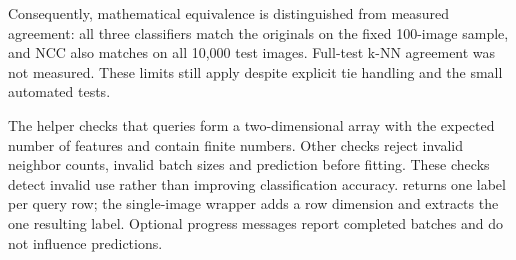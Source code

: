 Consequently, mathematical equivalence is distinguished from measured
agreement: all three classifiers match the originals on the fixed 100-image
sample, and NCC also matches on all 10,000 test images. Full-test k-NN
agreement was not measured. These limits still apply despite explicit
tie handling and the small automated tests.

The helper  checks that queries form a two-dimensional
array with the expected number of features and contain finite numbers.
Other checks reject invalid neighbor counts, invalid batch sizes and
prediction before fitting. These checks detect invalid use rather than
improving classification accuracy.  returns one label
per query row; the single-image  wrapper adds a row dimension
and extracts the one resulting label. Optional progress messages report
completed batches and do not influence predictions.
